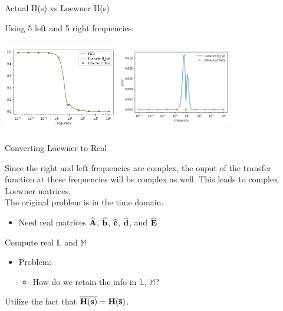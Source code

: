 \begin{frame}{Actual H(s) vs Loewner H(s)}

Using 5 left and 5 right frequencies:

\centering
\includegraphics[width=5cm, height= 4cm]{figures/loewner2.png}
\bigskip
\includegraphics[width=5cm, height=4cm]{figures/loewner1.png}

\end{frame}
\begin{frame}{Converting Loewner to Real}

Since the right and left frequencies are complex, the ouput of the transfer function at these frequencies will be complex as well. This leads to complex Loewner matrices.\\
\bigskip
The original problem is in the time domain.\\
\bigskip
\begin{itemize}
    \item <1-> Need real matrices $\bf \widehat A$, $\bf \widehat b$, $\bf \widehat c$, $\bf \widehat d$, and $\bf \widehat E$\\
\end{itemize}
\bigskip
Compute real $\mathbb{L}$ and $\mathbb{M}$
\bigskip
\begin{itemize}
    \item <1-> Problem:
    \begin{itemize}
        \item How do we retain the info in $\mathbb{L}$, $\mathbb{M}$?
    \end{itemize}
\end{itemize}
\bigskip
Utilize the fact that $\overline{\bf{H}(s)} = \bf{H}(\overline{s})$.

\end{frame}

